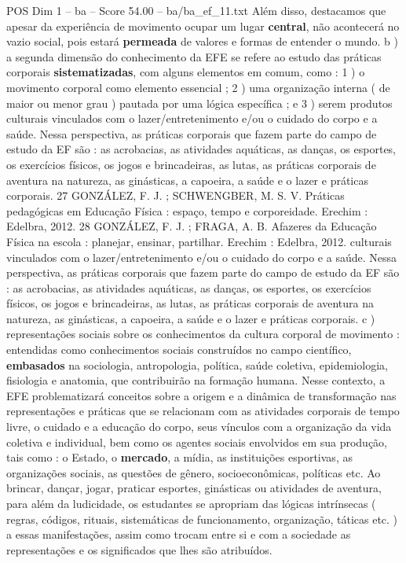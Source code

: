 \begin{textsample}{POS Dim 1 – ba – Score 54.00 – ba/ba\_ef\_11.txt}
Além disso, destacamos que apesar da experiência de movimento ocupar um lugar \textbf{central}, não acontecerá no vazio social, pois estará \textbf{permeada} de valores e formas de entender o mundo. b ) a segunda dimensão do conhecimento da EFE se refere ao estudo das práticas corporais \textbf{sistematizadas}, com alguns elementos em comum, como : 1 ) o movimento corporal como elemento essencial ; 2 ) uma organização interna ( de maior ou menor grau ) pautada por uma lógica específica ; e 3 ) serem produtos culturais vinculados com o lazer/entretenimento e/ou o cuidado do corpo e a saúde.
Nessa perspectiva, as práticas corporais que fazem parte do campo de estudo da EF são : as acrobacias, as atividades aquáticas, as danças, os esportes, os exercícios físicos, os jogos e brincadeiras, as lutas, as práticas corporais de aventura na natureza, as ginásticas, a capoeira, a saúde e o lazer e práticas corporais. 27 GONZÁLEZ, F.
J. ; SCHWENGBER, M.
S.
V.
Práticas pedagógicas em Educação Física : espaço, tempo e corporeidade.
Erechim : Edelbra, 2012. 28 GONZÁLEZ, F.
J. ; FRAGA, A.
B.
Afazeres da Educação Física na escola : planejar, ensinar, partilhar.
Erechim : Edelbra, 2012. culturais vinculados com o lazer/entretenimento e/ou o cuidado do corpo e a saúde.
Nessa perspectiva, as práticas corporais que fazem parte do campo de estudo da EF são : as acrobacias, as atividades aquáticas, as danças, os esportes, os exercícios físicos, os jogos e brincadeiras, as lutas, as práticas corporais de aventura na natureza, as ginásticas, a capoeira, a saúde e o lazer e práticas corporais. c ) representações sociais sobre os conhecimentos da cultura corporal de movimento : entendidas como conhecimentos sociais construídos no campo científico, \textbf{embasados} na sociologia, antropologia, política, saúde coletiva, epidemiologia, fisiologia e anatomia, que contribuirão na formação humana.
Nesse contexto, a EFE problematizará conceitos sobre a origem e a dinâmica de transformação nas representações e práticas que se relacionam com as atividades corporais de tempo livre, o cuidado e a educação do corpo, seus vínculos com a organização da vida coletiva e individual, bem como os agentes sociais envolvidos em sua produção, tais como : o Estado, o \textbf{mercado}, a mídia, as instituições esportivas, as organizações sociais, as questões de gênero, socioeconômicas, políticas etc.
Ao brincar, dançar, jogar, praticar esportes, ginásticas ou atividades de aventura, para além da ludicidade, os estudantes se apropriam das lógicas intrínsecas ( regras, códigos, rituais, sistemáticas de funcionamento, organização, táticas etc. ) a essas manifestações, assim como trocam entre si e com a sociedade as representações e os significados que lhes são atribuídos.

\end{textsample}
